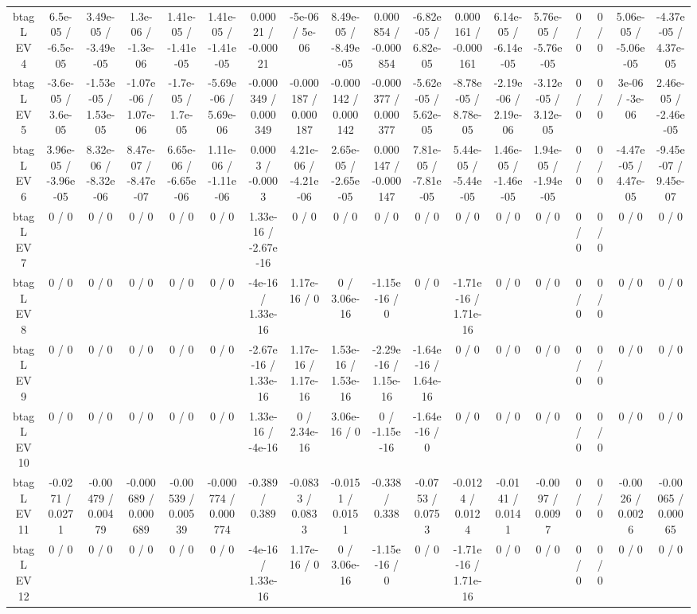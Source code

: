 \documentclass[10pt]{article}
\begin{document}
\begin{table}[htbp]
\begin{center}
\begin{tabular}{|c|c|c|c|c|c|c|c|c|c|c|c|c|c|c|c|c|c|}
  btag L EV 4 & 6.5e-05 / -6.5e-05 & 3.49e-05 / -3.49e-05 & 1.3e-06 / -1.3e-06 & 1.41e-05 / -1.41e-05 & 1.41e-05 / -1.41e-05 & 0.00021 / -0.00021 & -5e-06 / 5e-06 & 8.49e-05 / -8.49e-05 & 0.000854 / -0.000854 & -6.82e-05 / 6.82e-05 & 0.000161 / -0.000161 & 6.14e-05 / -6.14e-05 & 5.76e-05 / -5.76e-05 & 0 / 0 & 0 / 0 & 5.06e-05 / -5.06e-05 & -4.37e-05 / 4.37e-05 \\ 
  btag L EV 5 & -3.6e-05 / 3.6e-05 & -1.53e-05 / 1.53e-05 & -1.07e-06 / 1.07e-06 & -1.7e-05 / 1.7e-05 & -5.69e-06 / 5.69e-06 & -0.000349 / 0.000349 & -0.000187 / 0.000187 & -0.000142 / 0.000142 & -0.000377 / 0.000377 & -5.62e-05 / 5.62e-05 & -8.78e-05 / 8.78e-05 & -2.19e-06 / 2.19e-06 & -3.12e-05 / 3.12e-05 & 0 / 0 & 0 / 0 & 3e-06 / -3e-06 & 2.46e-05 / -2.46e-05 \\ 
  btag L EV 6 & 3.96e-05 / -3.96e-05 & 8.32e-06 / -8.32e-06 & 8.47e-07 / -8.47e-07 & 6.65e-06 / -6.65e-06 & 1.11e-06 / -1.11e-06 & 0.0003 / -0.0003 & 4.21e-06 / -4.21e-06 & 2.65e-05 / -2.65e-05 & 0.000147 / -0.000147 & 7.81e-05 / -7.81e-05 & 5.44e-05 / -5.44e-05 & 1.46e-05 / -1.46e-05 & 1.94e-05 / -1.94e-05 & 0 / 0 & 0 / 0 & -4.47e-05 / 4.47e-05 & -9.45e-07 / 9.45e-07 \\ 
  btag L EV 7 & 0 / 0 & 0 / 0 & 0 / 0 & 0 / 0 & 0 / 0 & 1.33e-16 / -2.67e-16 & 0 / 0 & 0 / 0 & 0 / 0 & 0 / 0 & 0 / 0 & 0 / 0 & 0 / 0 & 0 / 0 & 0 / 0 & 0 / 0 & 0 / 0 \\ 
  btag L EV 8 & 0 / 0 & 0 / 0 & 0 / 0 & 0 / 0 & 0 / 0 & -4e-16 / 1.33e-16 & 1.17e-16 / 0 & 0 / 3.06e-16 & -1.15e-16 / 0 & 0 / 0 & -1.71e-16 / 1.71e-16 & 0 / 0 & 0 / 0 & 0 / 0 & 0 / 0 & 0 / 0 & 0 / 0 \\ 
  btag L EV 9 & 0 / 0 & 0 / 0 & 0 / 0 & 0 / 0 & 0 / 0 & -2.67e-16 / 1.33e-16 & 1.17e-16 / 1.17e-16 & 1.53e-16 / 1.53e-16 & -2.29e-16 / 1.15e-16 & -1.64e-16 / 1.64e-16 & 0 / 0 & 0 / 0 & 0 / 0 & 0 / 0 & 0 / 0 & 0 / 0 & 0 / 0 \\ 
  btag L EV 10 & 0 / 0 & 0 / 0 & 0 / 0 & 0 / 0 & 0 / 0 & 1.33e-16 / -4e-16 & 0 / 2.34e-16 & 3.06e-16 / 0 & 0 / -1.15e-16 & -1.64e-16 / 0 & 0 / 0 & 0 / 0 & 0 / 0 & 0 / 0 & 0 / 0 & 0 / 0 & 0 / 0 \\ 
  btag L EV 11 & -0.0271 / 0.0271 & -0.00479 / 0.00479 & -0.000689 / 0.000689 & -0.00539 / 0.00539 & -0.000774 / 0.000774 & -0.389 / 0.389 & -0.0833 / 0.0833 & -0.0151 / 0.0151 & -0.338 / 0.338 & -0.0753 / 0.0753 & -0.0124 / 0.0124 & -0.0141 / 0.0141 & -0.0097 / 0.0097 & 0 / 0 & 0 / 0 & -0.0026 / 0.0026 & -0.00065 / 0.00065 \\ 
  btag L EV 12 & 0 / 0 & 0 / 0 & 0 / 0 & 0 / 0 & 0 / 0 & -4e-16 / 1.33e-16 & 1.17e-16 / 0 & 0 / 3.06e-16 & -1.15e-16 / 0 & 0 / 0 & -1.71e-16 / 1.71e-16 & 0 / 0 & 0 / 0 & 0 / 0 & 0 / 0 & 0 / 0 & 0 / 0 \\ 

\end{tabular}
\end{center}
\end{table}
\end{document}
